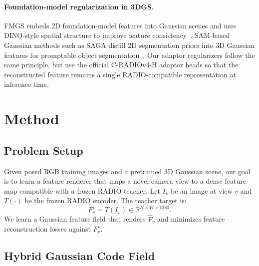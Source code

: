 \documentclass[10pt,twocolumn,letterpaper]{article}
\newcommand{\radio}{C-RADIOv4-H}
\begin{document}
\paragraph{Foundation-model regularization in 3DGS.}
FMGS embeds 2D foundation-model features into Gaussian scenes and uses DINO-style
spatial structure to improve feature consistency~\cite{liu2024fmgs}. SAM-based
Gaussian methods such as SAGA distill 2D segmentation priors into 3D Gaussian
features for promptable object segmentation~\cite{cen2023saga}. Our adaptor
regularizers follow the same principle, but use the official \radio{} adaptor
heads so that the reconstructed feature remains a single RADIO-compatible
representation at inference time.

\section{Method}

\subsection{Problem Setup}

Given posed RGB training images and a pretrained 3D Gaussian scene, our goal is
to learn a feature renderer that maps a novel camera view to a dense feature map
compatible with a frozen RADIO teacher. Let $I_v$ be an image at view $v$ and
$T(\cdot)$ be the frozen RADIO encoder. The teacher target is:
\begin{equation}
  F_v^{\star} = T(I_v) \in \mathbb{R}^{H \times W \times 1280}.
\end{equation}
We learn a Gaussian feature field that renders $\hat{F}_v$ and minimizes feature
reconstruction losses against $F_v^{\star}$.

\subsection{Hybrid Gaussian Code Field}
\end{document}
